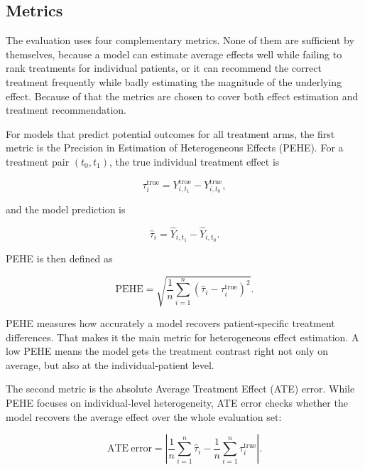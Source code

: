 \documentclass{article}
\begin{document}
\subsection{Metrics}
\label{sec:metrics}
The evaluation uses four complementary metrics. None of them are sufficient by themselves, because a model can estimate average effects well while failing to rank treatments for individual patients, or it can recommend the correct treatment frequently while badly estimating the magnitude of the underlying effect. Because of that the metrics are chosen to cover both effect estimation and treatment recommendation.

For models that predict potential outcomes for all treatment arms, the first metric is the Precision in Estimation of Heterogeneous Effects (PEHE). For a treatment pair $(t_0,t_1)$, the true individual treatment effect is

\begin{equation}
    \tau_i^{\text{true}} = Y_{i,t_1}^{\text{true}} - Y_{i,t_0}^{\text{true}},
\end{equation}

and the model prediction is

\begin{equation}
    \hat{\tau}_i = \hat{Y}_{i,t_1} - \hat{Y}_{i,t_0}.
\end{equation}

PEHE is then defined as

\begin{equation}
    \mathrm{PEHE} = \sqrt{\frac{1}{n} \sum_{i=1}^{n} \left(\hat{\tau}_i - \tau_i^{\text{true}}\right)^2 }.
\end{equation}

PEHE measures how accurately a model recovers patient-specific treatment differences. That makes it the main metric for heterogeneous effect estimation. A low PEHE means the model gets the treatment contrast right not only on average, but also at the individual-patient level.

The second metric is the absolute Average Treatment Effect (ATE) error. While PEHE focuses on individual-level heterogeneity, ATE error checks whether the model recovers the average effect over the whole evaluation set:

\begin{equation}
    \mathrm{ATE\ error} = \left| \frac{1}{n}\sum_{i=1}^{n} \hat{\tau}_i - \frac{1}{n}\sum_{i=1}^{n} \tau_i^{\text{true}} \right|.
\end{equation}
\end{document}
